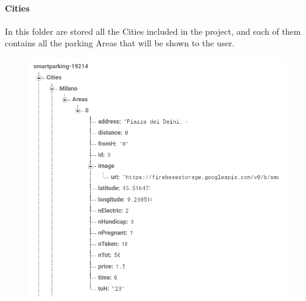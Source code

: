 \documentclass[11pt]{article} %
\begin{document}
\paragraph{Cities} 
In this folder are stored all the Cities included in the project, and each of them contains all the parking Areas that will be shown to the user. 
\begin{figure}[H]
\centering
\includegraphics[scale=1]{db_area.png}
\end{figure}
\end{document}
